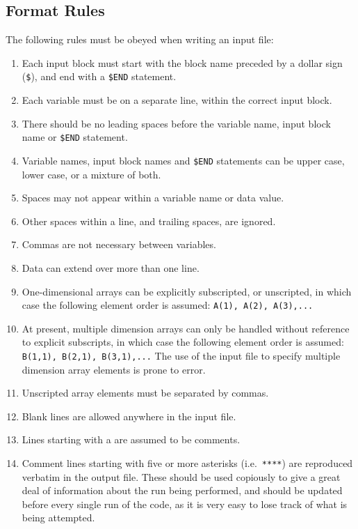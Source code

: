 \subsection{Format Rules}

The following rules must be obeyed when writing an input file:

\begin{enumerate}
\item
Each input block must start with the block name preceded by a dollar sign
({\tt \$}), and end with a {\tt \$END} statement.
\item
Each variable must be on a separate line, within the correct input block.
\item
There should be no leading spaces before the variable name, input block name
or {\tt \$END} statement.%
\item
Variable names, input block names and {\tt \$END} statements can be upper %
case, lower case, or a mixture of both.
\item
Spaces may not appear within a variable name or data value.
\item
Other spaces within a line, and trailing spaces, are ignored.
\item
Commas are not necessary between variables.
\item
Data can extend over more than one line.
\item
One-dimensional arrays can be explicitly subscripted, or unscripted, in which
case the following element order is assumed: {\tt A(1), A(2), A(3),...}
\item
At present, multiple dimension arrays can only be handled without reference to
explicit subscripts, in which case the following element order is assumed:
{\tt B(1,1), B(2,1), B(3,1),...} The use of the input file to specify multiple
dimension array elements is prone to error.
\item
Unscripted array elements must be separated by commas.
\item
Blank lines are allowed anywhere in the input file.
\item
Lines starting with a {\tt *} are assumed to be comments.
\item
Comment lines starting with five or more asterisks (i.e.\ {\tt *****}) are
reproduced verbatim in the output file. These should be used copiously to give
a great deal of information about the run being performed, and should be
updated before every single run of the code, as it is very easy to lose track
of what is being attempted.
\end{enumerate}

